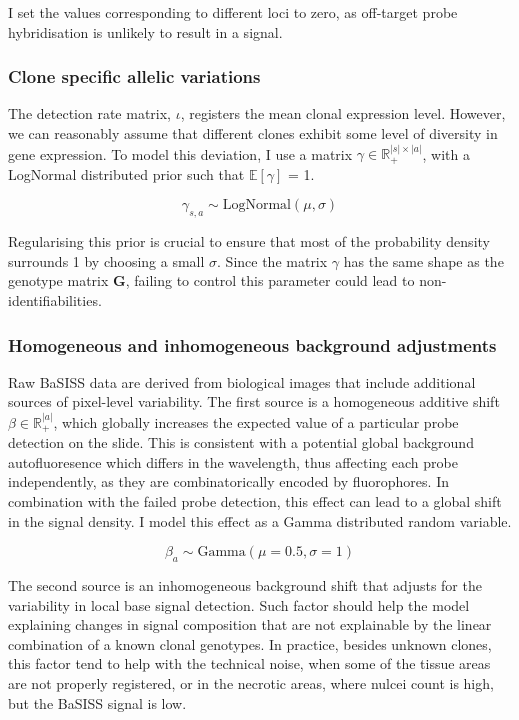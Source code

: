 I set the values corresponding to different loci to zero, as off-target probe hybridisation is unlikely to result in a signal.

\subsubsection*{Clone specific allelic variations}

The detection rate matrix, $\iota$, registers the mean clonal expression level. However, we can reasonably assume that different clones exhibit some level of diversity in gene expression. To model this deviation, I use a matrix $\gamma \in \mathbb{R}_{+}^{|s|\times|a|}$, with a LogNormal distributed prior such that $\mathbb{E}[\gamma]$ = 1.

\begin{equation} 
\gamma_{s,a} \sim \text{LogNormal}(\mu, \sigma)
\end{equation}

Regularising this prior is crucial to ensure that most of the probability density surrounds 1 by choosing a small $\sigma$. Since the matrix $\gamma$ has the same shape as the genotype matrix $\mathbf{G}$, failing to control this parameter could lead to non-identifiabilities.

\subsubsection*{Homogeneous and inhomogeneous background adjustments}
\label{sec:background_adjustment}
Raw BaSISS data are derived from biological images that include additional sources of pixel-level variability. The first source is a homogeneous additive shift $\beta \in \mathbb{R}_{+}^{|a|}$, which globally increases the expected value of a particular probe detection on the slide. This is consistent with a potential global background autofluoresence which differs in the wavelength, thus affecting each probe independently, as they are combinatorically encoded by fluorophores. In combination with the failed probe detection, this effect can lead to a global shift in the signal density. I model this effect as a Gamma distributed random variable.

\begin{equation} 
\beta_{a} \sim \text{Gamma}(\mu=0.5, \sigma=1) 
\end{equation}

The second source is an inhomogeneous background shift that adjusts for the variability in local base signal detection. Such factor should help the model explaining changes in signal composition that are not explainable by the linear combination of a known clonal genotypes. In practice, besides unknown clones, this factor tend to help with the technical noise, when some of the tissue areas are not properly registered, or in the necrotic areas, where nulcei count is high, but the \ac{BaSISS} signal is low.

